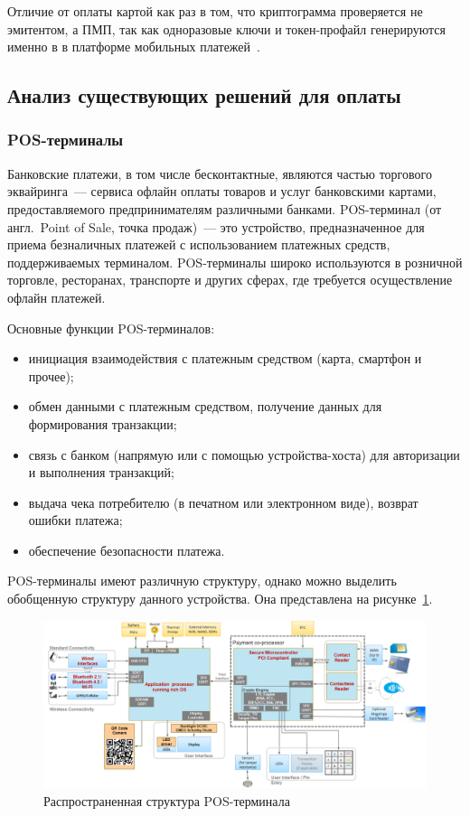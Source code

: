 Отличие от оплаты картой как раз в том, что криптограмма проверяется не эмитентом, а ПМП, так как одноразовые ключи и токен-профайл генерируются именно в в платформе мобильных платежей~\cite{habr_nspk_mir_payment}.



\subsection{Анализ существующих решений для оплаты}

\subsubsection{POS-терминалы}

Банковские платежи, в том числе бесконтактные, являются частью торгового эквайринга~--- сервиса офлайн оплаты товаров и услуг банковскими картами, предоставляемого предпринимателям различными банками.
POS-терминал (от англ.\ Point of Sale, точка продаж)~--- это устройство, предназначенное для приема безналичных платежей с использованием платежных средств, поддерживаемых терминалом.
POS-терминалы широко используются в розничной торговле, ресторанах, транспорте и других сферах, где требуется осуществление офлайн платежей.

Основные функции POS-терминалов:

\begin{itemize}
    \item инициация взаимодействия с платежным средством (карта, смартфон и прочее);
    \item обмен данными с платежным средством, получение данных для формирования транзакции;
    \item связь с банком (напрямую или с помощью устройства-хоста) для авторизации и выполнения транзакций;
    \item выдача чека потребителю (в печатном или электронном виде), возврат ошибки платежа;
    \item обеспечение безопасности платежа.
\end{itemize}

POS-терминалы имеют различную структуру, однако можно выделить обобщенную структуру данного устройства.
Она представлена на рисунке~\ref{fig:postrem_struct}.

\begin{figure}[h]
    \centering
    \includegraphics[width=1\textwidth]{images/research/postrem_struct}
    \caption{\centering Распространенная структура POS-терминала}
    \label{fig:postrem_struct}
\end{figure}


